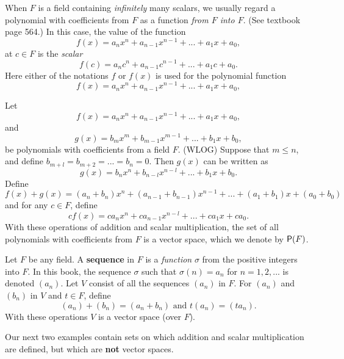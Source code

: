 \begin{note}
When \(F\) is a field containing \emph{infinitely} many scalars, we usually regard a polynomial with coefficients from \(F\) as a function \emph{from \(F\) into \(F\)}.
(See textbook page 564.)
In this case, the value of the function
\[
    f(x) = a_n x^n + a_{n - 1} x^{n - 1} + ... + a_1 x + a_0,
\]
at \(c \in F\) is the \emph{scalar}
\[
    f(c) = a_n c^n + a_{n - 1} c^{n - 1} + ... + a_1 c + a_0.
\]
Here either of the notations \(f\) or \(f(x)\) is used for the polynomial function
\[
    f(x) = a_n x^n + a_{n - 1} x^{n - 1} + ... + a_1 x + a_0,
\]
\end{note}

\begin{example} \label{example 1.2.4}
Let
\[
    f(x) = a_n x^n + a_{n - 1} x^{n - 1} + ... + a_1 x + a_0,
\]
and
\[
    g(x) = b_m x^m + b_{m - 1} x^{m - 1} + ... + b_1 x + b_0,
\]
be polynomials with coefficients from a field \(F\).
(WLOG) Suppose that \(m \le n\), and define \(b_{m+l} = b_{m+2} = ... = b_n = 0\).
Then \(g(x)\) can be written as
\[
    g(x) = b_n x^n + b_{n - l} x^{n - l} + ... + b_1 x + b_0.
\]
Define
\[
    f(x) + g(x) = (a_n + b_n) x^n + (a_{n - 1} + b_{n - 1}) x^{n - 1} + ... + (a_1 + b_1) x + (a_0 + b_0)
\]
and for any \(c \in F\), define
\[
    cf(x) = c {a_n} x^n + c a_{n-1} x^{n-l} + ... + c a_1 x + c a_0.
\]
With these operations of addition and scalar multiplication, the set of all polynomials with coefficients from \(F\) is a vector space, which we denote by \(\textsf{P}(F)\).
\end{example}

\begin{example} \label{example 1.2.5}
Let \(F\) be any field.
A \textbf{sequence} in \(F\) is a \emph{function} \(\sigma\) from the positive integers into \(F\).
In this book, the sequence \(\sigma\) such that \(\sigma(n) = a_n\) for \(n = 1, 2, ...\) is denoted \((a_n)\).
Let \(V\) consist of all the sequences \((a_n)\) in \(F\).
For \((a_n)\) and \((b_n)\) in \(V\) and \(t \in F\), define
\[
    (a_n) + (b_n) = (a_n + b_n) \text{ and } t(a_n) = (t a_n).
\]
With these operations \(V\) is a vector space (over \(F\)).
\end{example}

Our next two examples contain sets on which addition and scalar multiplication are defined, but which are \textbf{not} vector spaces.


